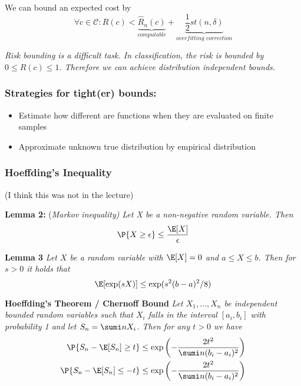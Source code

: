 We can bound an expected cost by
$$
	\forall c\in\mathcal C: R(c) < \underbrace{\hat R_n(c)}_{\textit{computable}} + \underbrace{\frac{1}{2} \mathit{st}(n,\delta)}_{\textit{overfitting correction}}
$$

\textit{Risk bounding is a difficult task. In classification, the risk is bounded by $0\leq R(c)\leq 1$. Therefore we can achieve distribution independent bounds.}


\subsubsection{Strategies for tight(er) bounds:}
\begin{itemize}
	\item Estimate how different are functions when they are evaluated on finite samples
	\item Approximate unknown true distribution by empirical distribution
\end{itemize}

\subsubsection{Hoeffding's Inequality}
(I think this was not in the lecture)

{\color{gray}
\textbf{Lemma 2: } (\textit{Markov inequality) Let X be a non-negative random variable. Then}
$$
	\P\{X\geq \epsilon\}\leq \frac{\E[X]}{\epsilon}
$$

\textbf{Lemma 3} \textit{Let $X$ be a random variable with $\E[X]=0$ and $a\leq X\leq b$. Then for $s>0$ it holds that}
$$
	\E[\exp(sX)]\leq \exp(s^2(b-a)^2/8)
$$

\textbf{Hoeffding's Theorem / Chernoff Bound} \textit{Let $X_1, ..., X_n$ be independent bounded random variables such that $X_i$ falls in the interval $[a_i, b_i]$ with probability 1 and let $S_n=\sumi n X_i$. Then for any $t>0$ we have }
\begin{align*}
	\P\{S_n - \E [S_n]\geq t\} & \leq \exp\left(-\frac{2t^2}{\sumi n (b_i - a_i)^2} \right) \\
	\P\{S_n - \E [S_n]\leq -t\} & \leq \exp\left(-\frac{2t^2}{\sumi n (b_i - a_i)^2} \right)
\end{align*}
}